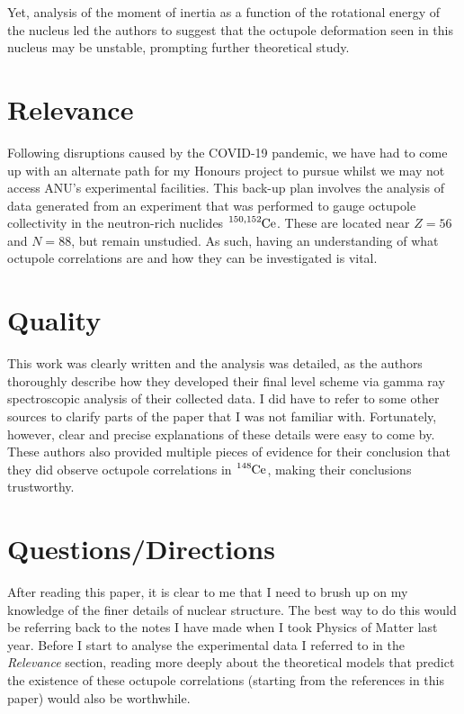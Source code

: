 \documentclass[12pt,a4paper]{article}
\begin{document}
\medskip
Yet, analysis of the moment of inertia as a function of the rotational energy of the nucleus led the authors to suggest that the octupole deformation seen in this nucleus may be unstable, prompting further theoretical study. 

\section*{Relevance}
Following disruptions caused by the COVID-19 pandemic, we have had to come up with an alternate path for my Honours project to pursue whilst we may not access ANU's experimental facilities. This back-up plan involves the analysis of data generated from an experiment that was performed to gauge octupole collectivity in the neutron-rich nuclides $\ce{^{150,152}Ce}$. These are located near $Z=56$ and $N=88$, but remain unstudied. As such, having an understanding of what octupole correlations are and how they can be investigated is vital.

\section*{Quality}
This work was clearly written and the analysis was detailed, as the authors thoroughly describe how they developed their final level scheme via gamma ray spectroscopic analysis of their collected data. I did have to refer to some other sources to clarify parts of the paper that I was not familiar with. Fortunately, however, clear and precise explanations of these details were easy to come by. These authors also provided multiple pieces of evidence for their conclusion that they did observe octupole correlations in $\ce{^{148}Ce}$, making their conclusions trustworthy.

\section*{Questions/Directions}
After reading this paper, it is clear to me that I need to brush up on my knowledge of the finer details of nuclear structure. The best way to do this would be referring back to the notes I have made when I took Physics of Matter last year. Before I start to analyse the experimental data I referred to in the \textit{Relevance} section, reading more deeply about the theoretical models that predict the existence of these octupole correlations (starting from the references in this paper) would also be worthwhile.

%
\end{document}
